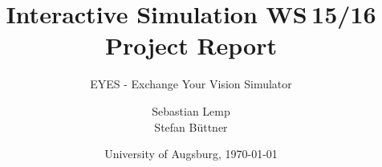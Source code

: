 \documentclass{acm_proc_article-sp}
\begin{document}
\title{
Interactive Simulation WS 15/16\\ %
Project Report
}
\subtitle{EYES - Exchange Your Vision Simulator}
\author{
\alignauthor
Sebastian Lemp\\
\alignauthor
Stefan Büttner\\
}

\date{University of Augsburg, \today}


\end{document}
